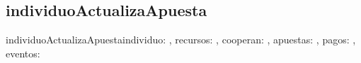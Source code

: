 \documentclass[10pt,a4paper]{article}
\begin{document}
\subsection{individuoActualizaApuesta}

\begin{proc}{individuoActualizaApuesta}{\In individuo: \nat, \In recursos: \TLista{\float} , \In cooperan: \TLista{\bool} , \Inout apuestas: \TLista{\TLista{\float}}, \In pagos: \TLista{\TLista{\float}} , \In eventos: \TLista{\TLista{\nat}} }{}


\end{proc}

\end{document}
